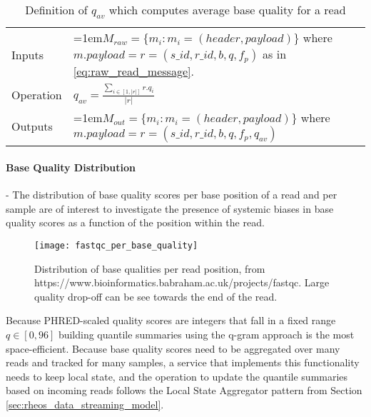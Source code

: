 \bgroup
\def\arraystretch{1.5}
\begin{table}[!ht]
    \caption{Definition of $q_{av}$ which computes average base quality for a read}
    \label{tab:op_average_base_quality}
    {\begin{tabular}{l|p{12cm}}
    \toprule
    Inputs & \hangindent=1em$M_{raw} = \{m_i: m_i = (header, payload)\}$ where $m.payload = r = (s\_id, r\_id, b, q, f_p)$ as in \ref{eq:raw_read_message}.\\
    \cline{2-2}
    Operation & $q_{av} = \frac{\sum_{i \in [1,|r|]} r.q_i}{|r|}$\\
    \cline{2-2}
    {Outputs} & \hangindent=1em$M_{out} = \{m_i: m_i = (header, payload)\}$ where $m.payload = r = (s\_id, r\_id, b, q, f_p, q_{av})$\\
    \bottomrule
    \end{tabular}}
\end{table}
\egroup


\paragraph{Base Quality Distribution} - The distribution of base quality scores per base position of a read and per sample are of interest to investigate the presence of systemic biases in base quality scores as a function of the position within the read.

\begin{figure}[H]
    \texttt{[image: fastqc\_per\_base\_quality]}
    \centering
    \caption {Distribution of base qualities per read position, from https://www.bioinformatics.babraham.ac.uk/projects/fastqc. Large quality drop-off can be see towards the end of the read.}
    \label{fig:main_body_fastqc_per_base_quality}
\end{figure} 


Because PHRED-scaled quality scores are integers that fall in a fixed range $q \in [0,96]$ building quantile summaries using the q-gram\autocite{shrivastava2004medians} approach is the most space-efficient. Because base quality scores need to be aggregated over many reads and tracked for many samples, a service that implements this functionality needs to keep local state, and the operation to update the quantile summaries based on incoming reads follows the Local State Aggregator pattern from Section \ref{sec:rheos_data_streaming_model}. 


